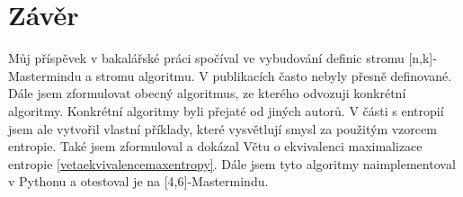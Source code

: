 \chapter*{Závěr}

Můj příspěvek v bakalářské práci spočíval ve vybudování definic stromu [n,k]-Mastermindu a stromu algoritmu. V publikacích často nebyly přesně definované. Dále jsem zformulovat obecný algoritmus, ze kterého odvozuji konkrétní algoritmy. Konkrétní algoritmy byli přejaté od jiných autorů. V části s entropií jsem ale vytvořil vlastní příklady, které vysvětlují smysl za použitým vzorcem entropie. Také jsem zformuloval a dokázal Větu o ekvivalenci maximalizace entropie \ref{vetaekvivalencemaxentropy}. Dále jsem tyto algoritmy naimplementoval v Pythonu a otestoval je na [4,6]-Mastermindu. 